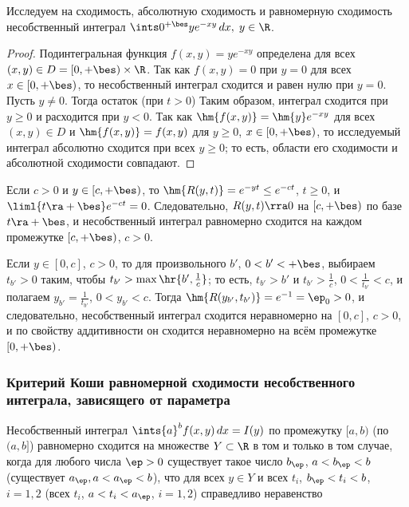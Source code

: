 \documentclass[a4paper]{article}
\begin{document}
\begin{ex}
Исследуем на сходимость, абсолютную сходимость и равномерную
сходимость несобственный интеграл $\ints0^{+\bes} ye^{-xy}\,dx, \;
y\in\R$.
\end{ex}

\begin{proof}
Подинтегральная функция $f(x,y)=ye^{-xy}$ определена для всех
$(x,y)\in D = [0,+\bes)\times\R$. Так как $f(x,y)=0$ при $y=0$ для
всех $x\in[0,+\bes)$, то несобственный интеграл сходится и равен
нулю при $y=0$. Пусть $y\ne0$. Тогда остаток (при $t>0$)  Таким образом, интеграл
сходится при $y\ge0$ и расходится при $y<0$. Так как
$\hm{f(x,y)}=\hm{y} e^{-xy}$ для всех $(x,y)\in D$ и $\hm{f(x,y)} =
f(x,y)$ для $y\ge0$, $x\in[0,+\bes)$, то исследуемый интеграл
абсолютно сходится при всех $y\ge0$; то есть, области его сходимости
и абсолютной сходимости совпадают.
\end{proof}

Если $c>0$ и $y\in[c,+\bes)$, то $\hm{R(y,t)} = e^{-yt} \le
e^{-ct}$, $t\ge0$, и $\liml{t\ra+\bes} e^{-ct}=0$. Следовательно,
$R(y,t)\rra0$ на $[c,+\bes)$ по базе $t\ra+\bes$, и несобственный
интеграл равномерно сходится на каждом промежутке $[c,+\bes)$,
$c>0$.

Если $y\in[0,c]$, $c>0$, то для произвольного $b'$, $0<b'<+\bes$,
выбираем $t_{b'}>0$ таким, чтобы $t_{b'} > \max \hr{b',\frac1c}$; то
есть, $t_{b'}>b'$ и $t_{b'}>\frac1c$, $0<\frac1{t_{b'}}<c$, и
полагаем $y_{b'}=\frac1{t_{b'}}$, $0<y_{b'}<c$. Тогда
$\hm{R(y_{b'},t_{b'})}=e^{-1}=\ep_0>0$, и следовательно,
несобственный интеграл сходится неравномерно на $[0,c]$, $c>0$, и по
свойству аддитивности он сходится неравномерно на всём промежутке
$[0,+\bes)$.

\subsubsection{Критерий Коши равномерной сходимости несобственного
интеграла, зависящего от параметра}

\begin{theorem}
Несобственный интеграл $\ints{a}^b f(x,y)\,dx=I(y)$ по промежутку
$[a,b)$ (по $(a,b]$) равномерно сходится на множестве $Y\subset\R$ в
том и только в том случае, когда для любого числа $\ep>0$ существует
такое число $b_{\ep}$, $a<b_{\ep}<b$ (существует $a_{\ep},
a<a_{\ep}<b$), что для всех $y\in Y$ и всех $t_i$, $b_{\ep}<t_i<b$,
$i=1,2$ (всех $t_i$, $a<t_i<a_{\ep}$, $i=1,2$) справедливо
неравенство 
\end{theorem}
\end{document}
